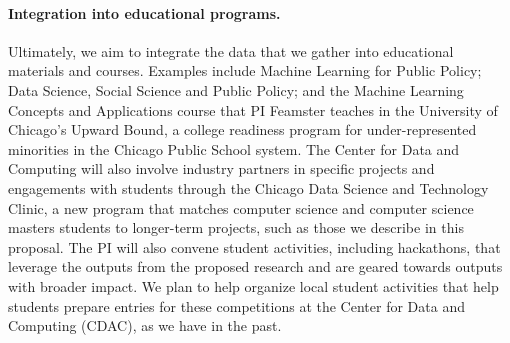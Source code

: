 \paragraph{Integration into educational programs.}
Ultimately, we aim to integrate the data that we gather into educational
materials and courses. Examples include Machine Learning for Public Policy;
Data Science, Social Science and Public Policy; and the Machine Learning
Concepts and Applications course that PI Feamster teaches in the University of
Chicago's Upward Bound, a college readiness program for under-represented
minorities in the Chicago Public School system. The Center for Data and
Computing will also involve industry partners in specific projects and
engagements with students through the Chicago Data Science and Technology
Clinic, a new program that matches computer science and computer science
masters students to longer-term projects, such as those we describe in this
proposal.
The PI will also convene student
activities, including hackathons, that leverage the outputs from the proposed
research and are geared towards outputs with broader impact.  We plan to help
organize local student activities that help students prepare
entries for these competitions at the Center for Data and Computing (CDAC), as we have in the past.


